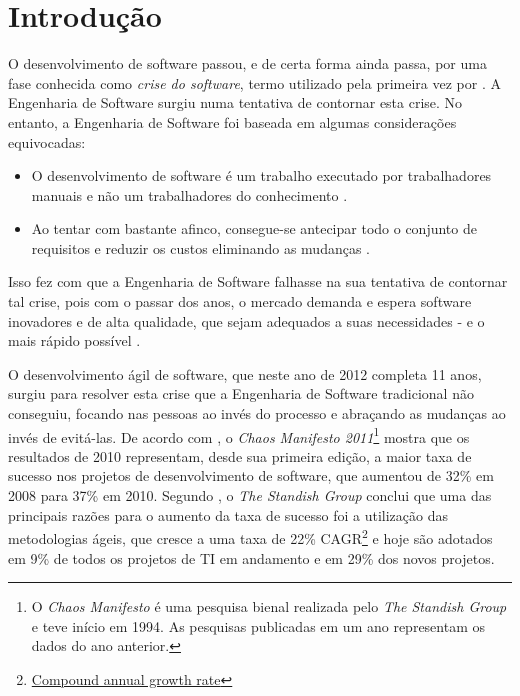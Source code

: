 \chapter{Introdução}

O desenvolvimento de software passou, e de certa forma ainda passa, por uma fase
conhecida como \emph{crise do software}, termo utilizado pela primeira vez por
. A Engenharia de Software surgiu
\cite{NaurRandell} numa tentativa de contornar esta crise. No entanto, a
Engenharia de Software foi baseada em algumas considerações equivocadas:

\begin{itemize}
    \item
        O desenvolvimento de software é um trabalho executado por trabalhadores
        manuais e não um trabalhadores do conhecimento \cite[38]{XPTeles}.
    \item
        Ao tentar com bastante afinco, consegue-se antecipar todo o conjunto de
        requisitos e reduzir os custos eliminando as mudanças
        \cite{TheBusinessOfInnovation}.
\end{itemize}

Isso fez com que a Engenharia de Software falhasse na sua tentativa de contornar
tal crise, pois com o passar dos anos, o mercado demanda e espera software
inovadores e de alta qualidade, que sejam adequados a suas necessidades - e o
mais rápido possível \cite{TheBusinessOfInnovation}.

O desenvolvimento ágil de software, que neste ano de 2012 completa 11 anos,
surgiu \cite{AgileManifesto} para resolver esta crise que a Engenharia de
Software tradicional não conseguiu, focando nas pessoas ao invés do processo e
abraçando as mudanças ao invés de evitá-las. De acordo com
, o \textit{Chaos Manifesto 2011}\footnote{O
\textit{Chaos Manifesto} é uma pesquisa bienal realizada pelo \textit{The
Standish Group} e teve início em 1994. As pesquisas publicadas em um ano
representam os dados do ano anterior.} mostra que os resultados de 2010
representam, desde sua primeira edição, a maior taxa de sucesso nos projetos de
desenvolvimento de software, que aumentou de 32\% em 2008 para 37\% em 2010.
Segundo , o \textit{The Standish Group} conclui
que uma das principais razões para o aumento da taxa de sucesso foi a utilização
das metodologias ágeis, que cresce a uma taxa de 22\%
CAGR\footnote{\href{http://en.wikipedia.org/wiki/Compound_annual_growth_rate}
{Compound annual growth rate}} e hoje são adotados em 9\% de todos os projetos
de TI em andamento e em 29\% dos novos projetos.

